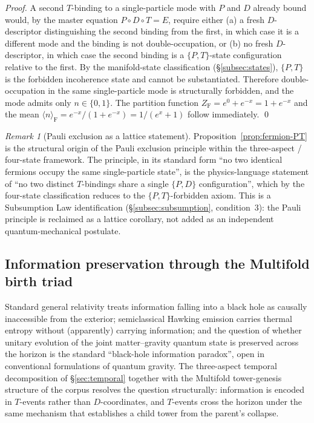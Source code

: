 \documentclass[11pt,a4paper]{article}
\theoremstyle{definition}
\theoremstyle{remark}
\newtheorem{remark}[theorem]{Remark}
\begin{document}
\begin{proof}
A second $T$-binding to a single-particle mode with $P$ and $D$ already bound would, by the master equation $P\circ D\circ T = E$, require either (a) a fresh $D$-descriptor distinguishing the second binding from the first, in which case it is a different mode and the binding is not double-occupation, or (b) no fresh $D$-descriptor, in which case the second binding is a $\{P,T\}$-state configuration relative to the first. By the manifold-state classification (\S\ref{subsec:states}), $\{P,T\}$ is the forbidden incoherence state and cannot be substantiated. Therefore double-occupation in the same single-particle mode is structurally forbidden, and the mode admits only $n \in \{0,1\}$. The partition function $Z_{\mathrm{F}} = e^{0} + e^{-x} = 1 + e^{-x}$ and the mean $\langle n\rangle_{\mathrm{F}} = e^{-x}/(1 + e^{-x}) = 1/(e^{x} + 1)$ follow immediately. \qed
\end{proof}

\begin{remark}[Pauli exclusion as a lattice statement]\label{rem:pauli-lattice}
Proposition~\ref{prop:fermion-PT} is the structural origin of the Pauli exclusion principle within the three-aspect / four-state framework. The principle, in its standard form ``no two identical fermions occupy the same single-particle state'', is the physics-language statement of ``no two distinct $T$-bindings share a single $\{P,D\}$ configuration'', which by the four-state classification reduces to the $\{P,T\}$-forbidden axiom. This is a Subsumption Law identification (\S\ref{subsec:subsumption}, condition~3): the Pauli principle is reclaimed as a lattice corollary, not added as an independent quantum-mechanical postulate.
\end{remark}

\subsection{Information preservation through the Multifold birth triad}\label{subsec:info-birthtriad}

Standard general relativity treats information falling into a black hole as causally inaccessible from the exterior; semiclassical Hawking emission carries thermal entropy without (apparently) carrying information; and the question of whether unitary evolution of the joint matter--gravity quantum state is preserved across the horizon is the standard ``black-hole information paradox'', open in conventional formulations of quantum gravity. The three-aspect temporal decomposition of \S\ref{sec:temporal} together with the Multifold tower-genesis structure of the corpus resolves the question structurally: information is encoded in $T$-events rather than $D$-coordinates, and $T$-events cross the horizon under the same mechanism that establishes a child tower from the parent's collapse.
\end{document}
